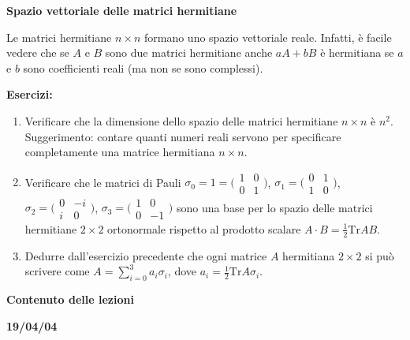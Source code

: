 \documentclass[a4paper,10pt]{article}
\newcommand{\linea}{\vskip14pt \noindent}
\begin{document}
\newpage

\centerline {\bf Spazio vettoriale delle matrici hermitiane}

\linea
Le matrici hermitiane $n\times n$ formano uno spazio vettoriale reale.
Infatti, \`e facile vedere che se $A$ e $B$ sono
due matrici hermitiane anche $a A + b B$ \`e hermitiana se $a$ e $b$ sono coefficienti reali (ma non se
sono complessi).

\linea
{\bf Esercizi:}
\begin{enumerate}
\item Verificare che la dimensione dello spazio delle matrici hermitiane $n\times n$ \`e $n^2$. \\
Suggerimento: contare quanti numeri reali servono per specificare completamente una matrice hermitiana
$n\times n$.
\item Verificare che le matrici di Pauli
$\sigma_0=1=\bigl( \begin{smallmatrix} 1 & 0 \\ 0 & 1 \end{smallmatrix} \bigr)$, 
$\sigma_1=\bigl( \begin{smallmatrix} 0 & 1 \\ 1 & 0 \end{smallmatrix} \bigr)$,
$\sigma_2=\bigl( \begin{smallmatrix} 0 & -i \\ i & 0 \end{smallmatrix} \bigr)$,
$\sigma_3=\bigl( \begin{smallmatrix} 1 & 0  \\ 0 & -1 \end{smallmatrix} \bigr)$ 
sono una base per lo spazio delle matrici hermitiane $2 \times 2$ ortonormale rispetto al
prodotto scalare $A \cdot B = \frac{1}{2} \text{Tr} A B$.
\item Dedurre dall'esercizio precedente che ogni matrice $A$ hermitiana $2\times 2$ si pu\`o scrivere come
$A=\sum_{i=0}^3 a_i \sigma_i$, dove $a_i = \frac{1}{2} \text{Tr} A \sigma_i$.
\end{enumerate}



\newpage


\centerline{\LARGE \bf Contenuto delle lezioni}
\vskip 12pt
\noindent
\textbf{19/04/04}
\end{document}
